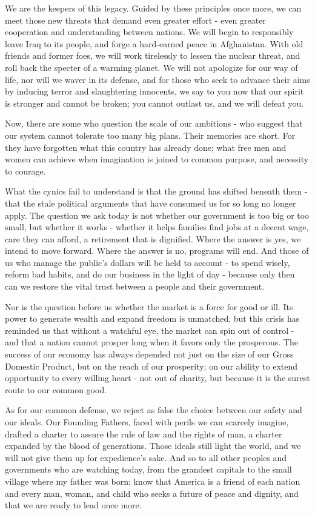 \documentclass[12pt,a4paper,onecolumn]{article}
\begin{document}
\begin{sffamily}
We are the keepers of this legacy. Guided by these principles once more, we can meet those new
threats that demand even greater effort - even greater cooperation and understanding between
nations. We will begin to responsibly leave Iraq to its people, and forge a hard-earned peace in
Afghanistan. With old friends and former foes, we will work tirelessly to lessen the nuclear threat,
and roll back the specter of a warming planet. We will not apologize for our way of life, nor will
we waver in its defense, and for those who seek to advance their aims by inducing terror and
slaughtering innocents, we say to you now that our spirit is stronger and cannot be broken; you
cannot outlast us, and we will defeat you.

Now, there are some who question the scale of our ambitions - who suggest that our system cannot
tolerate too many big plans. Their memories are short. For they have forgotten what this country has
already done; what free men and women can achieve when imagination is joined to common purpose, and
necessity to courage.

What the cynics fail to understand is that the ground has shifted beneath them - that the stale
political arguments that have consumed us for so long no longer apply. The question we ask today is
not whether our government is too big or too small, but whether it works - whether it helps families
find jobs at a decent wage, care they can afford, a retirement that is dignified. Where the answer
is yes, we intend to move forward. Where the answer is no, programs will end. And those of us who
manage the public's dollars will be held to account - to spend wisely, reform bad habits, and do our
business in the light of day - because only then can we restore the vital trust between a people and
their government.

Nor is the question before us whether the market is a force for good or ill. Its power to generate
wealth and expand freedom is unmatched, but this crisis has reminded us that without a watchful eye,
the market can spin out of control - and that a nation cannot prosper long when it favors only the
prosperous. The success of our economy has always depended not just on the size of our Gross
Domestic Product, but on the reach of our prosperity; on our ability to extend opportunity to every
willing heart - not out of charity, but because it is the surest route to our common good.

As for our common defense, we reject as false the choice between our safety and our ideals. Our
Founding Fathers, faced with perils we can scarcely imagine, drafted a charter to assure the rule of
law and the rights of man, a charter expanded by the blood of generations. Those ideals still light
the world, and we will not give them up for expedience's sake. And so to all other peoples and
governments who are watching today, from the grandest capitals to the small village where my father
was born: know that America is a friend of each nation and every man, woman, and child who seeks a
future of peace and dignity, and that we are ready to lead once more.


\end{sffamily}
\end{document}
